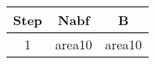 \documentclass{article}
\begin{document}
\begin{tabular}{|c|c|c|}
\hline
Step&Nabf&B\\
\hline
1&area10&area10\\\hline
\end{tabular}
\end{document}

